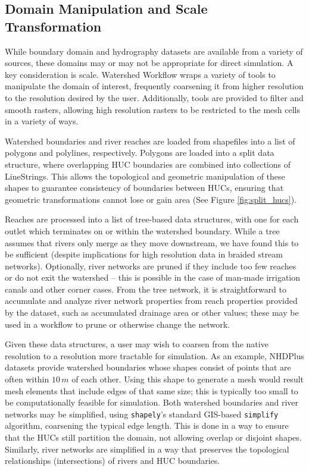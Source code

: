\documentclass[a4paper,fleqn]{cas-dc}
\newcommand{\code}[1]{\texttt{#1}}
\begin{document}
\subsection{Domain Manipulation and Scale Transformation}
%
While boundary domain and hydrography datasets are available from a variety of sources, these domains may or may not be appropriate for direct simulation.
A key consideration is scale.
Watershed Workflow wraps a variety of tools to manipulate the domain of interest, frequently coarsening it from higher resolution to the resolution desired by the user.
Additionally, tools are provided to filter and smooth rasters, allowing high resolution rasters to be restricted to the mesh cells in a variety of ways.

Watershed boundaries and river reaches are loaded from shapefiles into a list of polygons and polylines, respectively.
Polygons are loaded into a split data structure, where overlapping HUC boundaries are combined into collections of LineStrings.
This allows the topological and geometric manipulation of these shapes to guarantee consistency of boundaries between HUCs, ensuring that geometric transformations cannot lose or gain area (See Figure \ref{fig:split_hucs}).

Reaches are processed into a list of tree-based data structures, with one for each outlet which terminates on or within the watershed boundary.
While a tree assumes that rivers only merge as they move downstream, we have found this to be sufficient (despite implications for high resolution data in braided stream networks).
Optionally, river networks are pruned if they include too few reaches or do not exit the watershed -- this is possible in the case of man-made irrigation canals and other corner cases.
From the tree network, it is straightforward to accumulate and analyze river network properties from reach properties provided by the dataset, such as accumulated drainage area or other values; these may be used in a workflow to prune or otherwise change the network.

Given these data structures, a user may wish to coarsen from the native resolution to a resolution more tractable for simulation.
As an example, NHDPlus datasets provide watershed boundaries whose shapes consist of points that are often within $10\,m$ of each other.
Using this shape to generate a mesh would result mesh elements that include edges of that same size; this is typically too small to be computationally feasible for simulation.
Both watershed boundaries and river networks may be simplified, using \code{shapely}'s standard GIS-based \code{simplify} algorithm, coarsening the typical edge length.
This is done in a way to ensure that the HUCs still partition the domain, not allowing overlap or disjoint shapes.
Similarly, river networks are simplified in a way that preserves the topological relationships (intersections) of rivers and HUC boundaries.
\end{document}
